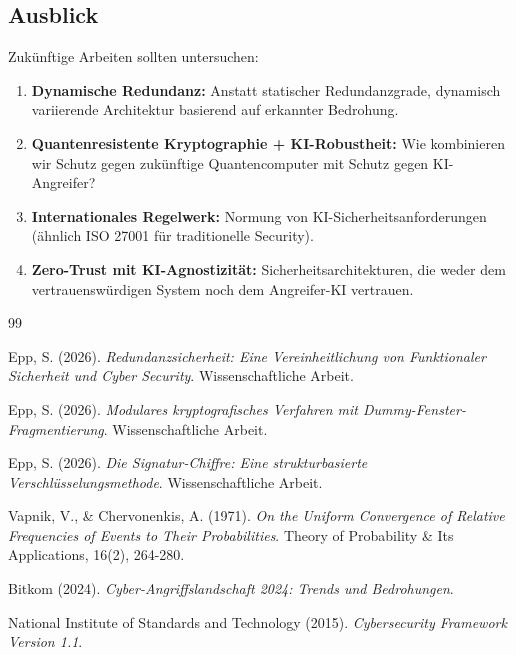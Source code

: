 \documentclass[a4paper,12pt]{article}
\theoremstyle{definition}
\begin{document}
\subsection{Ausblick}

Zukünftige Arbeiten sollten untersuchen:

\begin{enumerate}
	\item \textbf{Dynamische Redundanz:} Anstatt statischer Redundanzgrade, dynamisch variierende Architektur basierend auf erkannter Bedrohung.
	
	\item \textbf{Quantenresistente Kryptographie + KI-Robustheit:} Wie kombinieren wir Schutz gegen zukünftige Quantencomputer mit Schutz gegen KI-Angreifer?
	
	\item \textbf{Internationales Regelwerk:} Normung von KI-Sicherheitsanforderungen (ähnlich ISO 27001 für traditionelle Security).
	
	\item \textbf{Zero-Trust mit KI-Agnostizität:} Sicherheitsarchitekturen, die weder dem vertrauenswürdigen System noch dem Angreifer-KI vertrauen.
\end{enumerate}

\begin{thebibliography}{99}

Epp, S. (2026).
\emph{Redundanzsicherheit: Eine Vereinheitlichung von Funktionaler Sicherheit und Cyber Security}.
Wissenschaftliche Arbeit.

Epp, S. (2026).
\emph{Modulares kryptografisches Verfahren mit Dummy-Fenster-Fragmentierung}.
Wissenschaftliche Arbeit.

Epp, S. (2026).
\emph{Die Signatur-Chiffre: Eine strukturbasierte Verschlüsselungsmethode}.
Wissenschaftliche Arbeit.

Vapnik, V., \& Chervonenkis, A. (1971).
\emph{On the Uniform Convergence of Relative Frequencies of Events to Their Probabilities}.
Theory of Probability \& Its Applications, 16(2), 264-280.

Bitkom (2024).
\emph{Cyber-Angriffslandschaft 2024: Trends und Bedrohungen}.

National Institute of Standards and Technology (2015).
\emph{Cybersecurity Framework Version 1.1}.

\end{thebibliography}
\end{document}
